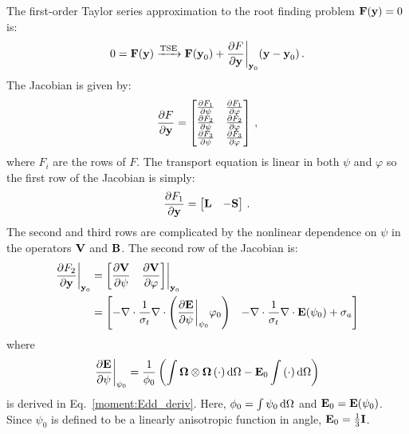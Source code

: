 \documentclass[../doc.tex]{subfiles}
\begin{document}
The first-order Taylor series approximation to the root finding problem $\boldsymbol{\mathrm{F}}(\boldsymbol{\mathrm{y}}) = 0$ is: 
	\begin{equation} \label{moment:smm_root}
		0 = \boldsymbol{\mathrm{F}}(\boldsymbol{\mathrm{y}}) \xrightarrow{\text{TSE}} \boldsymbol{\mathrm{F}}(\boldsymbol{\mathrm{y}}_0) + \frac{\partial F}{\partial \boldsymbol{\mathrm{y}}}\biggr\rvert_{\boldsymbol{\mathrm{y}}_0}(\boldsymbol{\mathrm{y}} - \boldsymbol{\mathrm{y}}_0) \,. 
	\end{equation}
The Jacobian is given by: 
	\begin{equation}
		\frac{\partial F}{\partial \boldsymbol{\mathrm{y}}} = \begin{bmatrix} 
			\frac{\partial F_1}{\partial \psi} & \frac{\partial F_1}{\partial \varphi} \\ 
			\frac{\partial F_2}{\partial \psi} & \frac{\partial F_2}{\partial \varphi} \\ 
			\frac{\partial F_3}{\partial \psi} & \frac{\partial F_3}{\partial \varphi} 
		\end{bmatrix} \,,
	\end{equation}
where $F_i$ are the rows of $F$. The transport equation is linear in both $\psi$ and $\varphi$ so the first row of the Jacobian is simply: 
	\begin{equation}
		\frac{\partial F_1}{\partial \boldsymbol{\mathrm{y}}} = \begin{bmatrix} 
			\boldsymbol{\mathrm{L}} & -\boldsymbol{\mathrm{S}} 
		\end{bmatrix} \,. 
	\end{equation}
The second and third rows are complicated by the nonlinear dependence on $\psi$ in the operators $\boldsymbol{\mathrm{V}}$ and $\boldsymbol{\mathrm{B}}$. The second row of the Jacobian is: 
	\begin{equation}
	\begin{aligned}
		\frac{\partial F_2}{\partial \boldsymbol{\mathrm{y}}}\biggr\rvert_{\boldsymbol{\mathrm{y}}_0} &= \begin{bmatrix} 
			\displaystyle\frac{\partial \boldsymbol{\mathrm{V}}}{\partial \psi} & \displaystyle\frac{\partial \boldsymbol{\mathrm{V}}}{\partial \varphi} 
		\end{bmatrix} \biggr\rvert_{\boldsymbol{\mathrm{y}}_0} \\
		&= \begin{bmatrix} 
			\displaystyle-\nabla\cdot\frac{1}{\sigma_t}\nabla\cdot\left( \frac{\partial \boldsymbol{\mathrm{E}}}{\partial \psi}\biggr\rvert_{\psi_0}\varphi_0 \right) & 
			\displaystyle-\nabla\cdot\frac{1}{\sigma_t}\nabla\cdot\boldsymbol{\mathrm{E}}(\psi_0) + \sigma_a 
		\end{bmatrix} 
	\end{aligned}
	\end{equation}
where 
	\begin{equation}
	 	\frac{\partial \boldsymbol{\mathrm{E}}}{\partial \psi}\biggr\rvert_{\psi_0} = \frac{1}{\phi_0}\left( \int \boldsymbol{\Omega}\otimes\boldsymbol{\Omega}\left( \cdot \right)\mathop{}\!\mathrm{d}\Omega - \boldsymbol{\mathrm{E}}_0\int \left( \cdot \right)\mathop{}\!\mathrm{d}\Omega \right)
	\end{equation} 
is derived in Eq.~\ref{moment:Edd_deriv}. Here, $\phi_0 = \int \psi_0 \mathop{}\!\mathrm{d} \Omega$ and $\boldsymbol{\mathrm{E}}_0 = \boldsymbol{\mathrm{E}}(\psi_0)$. Since $\psi_0$ is defined to be a linearly anisotropic function in angle, $\boldsymbol{\mathrm{E}}_0 = \frac{1}{3}\boldsymbol{\mathrm{I}}$. 
\end{document}
